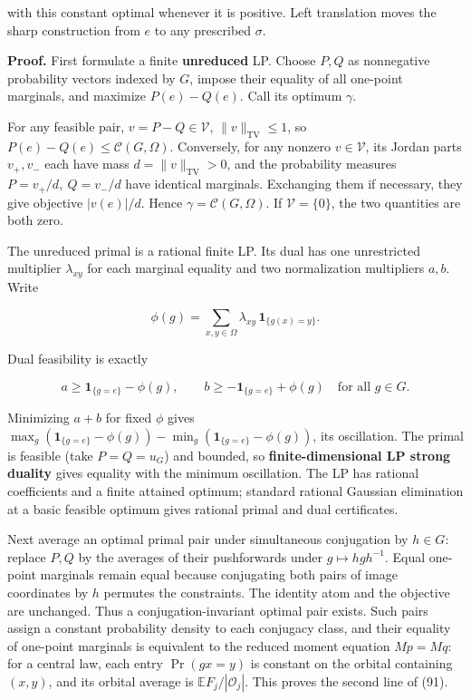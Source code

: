 \documentclass[
  11pt,
]{article}
\begin{document}
with this constant optimal whenever it is positive. Left translation
moves the sharp construction from \(e\) to any prescribed \(\sigma\).

\textbf{Proof.} First formulate a finite \textbf{unreduced} LP. Choose
\(P,Q\) as nonnegative probability vectors indexed by \(G\), impose
their equality of all one-point marginals, and maximize \(P(e)-Q(e)\).
Call its optimum \(\gamma\).

For any feasible pair, \(v=P-Q\in\mathcal V\),
\(\|v\|_{\mathrm{TV}}\le1\), so \(P(e)-Q(e)\le\mathcal C(G,\Omega)\).
Conversely, for any nonzero \(v\in\mathcal V\), its Jordan parts
\(v_+,v_-\) each have mass \(d=\|v\|_{\mathrm{TV}}>0\), and the
probability measures \(P=v_+/d,\ Q=v_-/d\) have identical marginals.
Exchanging them if necessary, they give objective \(|v(e)|/d\). Hence
\(\gamma=\mathcal C(G,\Omega)\). If \(\mathcal V=\{0\}\), the two
quantities are both zero.

The unreduced primal is a rational finite LP. Its dual has one
unrestricted multiplier \(\lambda_{xy}\) for each marginal equality and
two normalization multipliers \(a,b\). Write

\[
\phi(g)=\sum_{x,y\in\Omega}\lambda_{xy}\,\mathbf1_{\{g(x)=y\}}.
\]

Dual feasibility is exactly

\[
a\ge\mathbf1_{\{g=e\}}-\phi(g),\qquad
b\ge-\mathbf1_{\{g=e\}}+\phi(g)
\quad\text{for all }g\in G.
\]

Minimizing \(a+b\) for fixed \(\phi\) gives
\(\max_g(\mathbf1_{\{g=e\}}-\phi(g))-
\min_g(\mathbf1_{\{g=e\}}-\phi(g))\), its oscillation. The primal is
feasible (take \(P=Q=u_G\)) and bounded, so \textbf{finite-dimensional
LP strong duality} gives equality with the minimum oscillation. The LP
has rational coefficients and a finite attained optimum; standard
rational Gaussian elimination at a basic feasible optimum gives rational
primal and dual certificates.

Next average an optimal primal pair under simultaneous conjugation by
\(h\in G\): replace \(P,Q\) by the averages of their pushforwards under
\(g\mapsto hgh^{-1}\). Equal one-point marginals remain equal because
conjugating both pairs of image coordinates by \(h\) permutes the
constraints. The identity atom and the objective are unchanged. Thus a
conjugation-invariant optimal pair exists. Such pairs assign a constant
probability density to each conjugacy class, and their equality of
one-point marginals is equivalent to the reduced moment equation
\(Mp=Mq\): for a central law, each entry \(\Pr(gx=y)\) is constant on
the orbital containing \((x,y)\), and its orbital average is
\(\mathbb EF_j/|\mathcal O_j|\). This proves the second line of (91).
\end{document}
